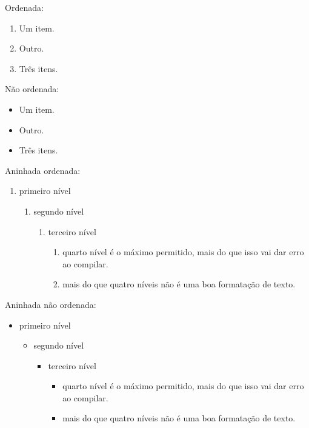 \documentclass[a4paper,12pt]{article}
\begin{document}
Ordenada:

\begin{enumerate}
	\item Um item.
	\item Outro.
	\item Três itens.
\end{enumerate}

Não ordenada:

\begin{itemize}
	\item Um item.
	\item Outro.
	\item Três itens.
\end{itemize}

Aninhada ordenada:

\begin{enumerate}
	\item primeiro nível
	\begin{enumerate}
		\item segundo nível
		\begin{enumerate}
			\item terceiro nível
			\begin{enumerate}
				\item quarto nível é o máximo permitido, mais do que isso vai dar erro ao compilar.
				\item mais do que quatro níveis não é uma boa formatação de texto.
			\end{enumerate}
		\end{enumerate}
	\end{enumerate}
\end{enumerate}

Aninhada não ordenada:

\begin{itemize}
	\item primeiro nível
	\begin{itemize}
		\item segundo nível
		\begin{itemize}
			\item terceiro nível
			\begin{itemize}
				\item quarto nível é o máximo permitido, mais do que isso vai dar erro ao compilar.
				\item mais do que quatro níveis não é uma boa formatação de texto.
			\end{itemize}
		\end{itemize}
	\end{itemize}
\end{itemize}
\end{document}

